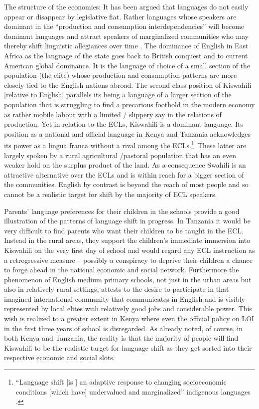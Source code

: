\documentclass[output=paper,colorlinks,citecolor=brown]{langscibook}
\begin{document}
The structure of the economies: It has been argued that languages do not easily appear or disappear by legislative fiat. Rather languages whose speakers are dominant in the “production and consumption interdependencies” will become dominant languages and attract speakers of marginalized communities who may thereby shift linguistic allegiances over time  \citep[218]{Mufwene2004}. The dominance of English in East Africa as the language of the state goes back to British conquest and to current American global dominance. It is the language of choice of a small section of the population (the elite) whose production and consumption patterns are more closely tied to the English nations abroad. The second class position of Kiswahili [relative to English] parallels its being a language of a larger section of the population that is struggling to find a precarious foothold in the modern economy as rather mobile labour with a limited / slippery say in the relations of production. Yet in relation to the ECLs, Kiswahili is a dominant language. Its position as a national and official language in Kenya and Tanzania acknowledges its power as a lingua franca without a rival among the ECLs.\footnote{“Language shift [is ] an adaptive response to changing socioeconomic conditions [which have] undervalued and marginalized” indigenous languages \citep[207]{Mufwene2004}.
}~These latter are largely spoken by a rural agricultural /pastoral population that has an even weaker hold on the surplus product of the land. As a consequence Swahili is an attractive alternative over the ECLs and is within reach for a bigger section of the communities. English by contrast is beyond the reach of most people and so cannot be a realistic target for shift by the majority of ECL speakers.

Parents’ language preferences for their children in the schools provide a good illustration of the patterns of language shift in progress. In Tanzania it would be very difficult to find parents who want their children to be taught in the ECL. Instead in the rural areas, they support the children’s immediate immersion into Kiswahili on the very first day of school and would regard any ECL instruction as a retrogressive measure – possibly a conspiracy to deprive their children a chance to forge ahead in the national economic and social network.  Furthermore the phenomenon of English medium primary schools, not just in the urban areas but also in relatively rural settings, attests to the desire to participate in that imagined international community that communicates in English and is visibly represented by local elites with relatively good jobs and considerable power. This wish is realized to a greater extent in Kenya where even the official policy on LOI in the first three years of school is disregarded. As already noted, of course, in both Kenya and Tanzania, the reality is that the majority of people will find Kiswahili to be the realistic target for language shift as they get sorted into their respective economic and social slots.
\end{document}
